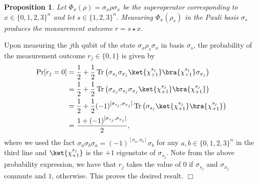 \documentclass[11pt]{article}
\theoremstyle{plain}
\newtheorem{proposition}[theorem]{Proposition}
\renewcommand{\Pr}{\mbox{\rm Pr}}
\DeclareMathOperator{\Tr}{Tr}
\theoremstyle{plain}
\theoremstyle{definition}
\theoremstyle{remark}
\renewenvironment{proof}[1][]{
    \begin{trivlist}
    \item[\hspace{\labelsep}{\em\noindent Proof#1:\/}]}
    {{\hfill$\Box$}
    \end{trivlist}
}
\theoremstyle{named}
\begin{document}
\begin{proposition}
Let $\Phi_x(\rho) = \sigma_x \rho \sigma_x$ be the superoperator corresponding to $x \in \{0,1,2,3\}^n$ and let $s\in \{1,2,3\}^n.$ Measuring $\Phi_x(\rho_s)$ in the Pauli basis $\sigma_s$ produces the measurement outcome $r = s \star x$. 
\label{prop:outcomes_queries_pauli_channel}
\end{proposition}

\begin{proof}

    Upon measuring the $j$th qubit of the state $\sigma_x \rho_s \sigma_x$ in basis $\sigma_s$, the probability of the measurement outcome $r_j \in \{0,1\}$ is given by
    \begin{align*}
        \Pr[r_j = 0] &= \frac{1}{2} + \frac{1}{2}\Tr\left(\sigma_{s_j} \sigma_{x_j} \ket{\chi_{+1}^{s_j}}\bra{\chi_{+1}^{s_j}} \sigma_{x_j} \right) \\ 
        &= \frac{1}{2} + \frac{1}{2}\Tr\left(\sigma_{x_j} \sigma_{s_j} \sigma_{x_j} \ket{\chi_{+1}^{s_j}}\bra{\chi_{+1}^{s_j}} \right) \\
        &= \frac{1}{2} + \frac{1}{2}(-1)^{[\sigma_{s_j}, \sigma_{x_j}]} \Tr\left(\sigma_{s_j} \ket{\chi_{+1}^{s_j}}\bra{\chi_{+1}^{s_j}} \right) \\
        &= \frac{1 + (-1)^{[\sigma_{s_j}, \sigma_{x_j}]}}{2},
    \end{align*}
    where we used the fact $\sigma_{a} \sigma_{b} \sigma_{a} = (-1)^{[\sigma_a,\sigma_b]} \sigma_b$ for any $a,b \in \{0,1,2,3\}^n$ in the third line and $\ket{\chi_{+1}^{s_j}}$ is the $+1$ eigenstate of $\sigma_{s_j}$. Note from the above probability expression, we have that $r_j$ takes the value of $0$ if $\sigma_{s_j}$ and $\sigma_{x_j}$ commute and $1$, otherwise. This proves the desired result.
\end{proof}
\end{document}
